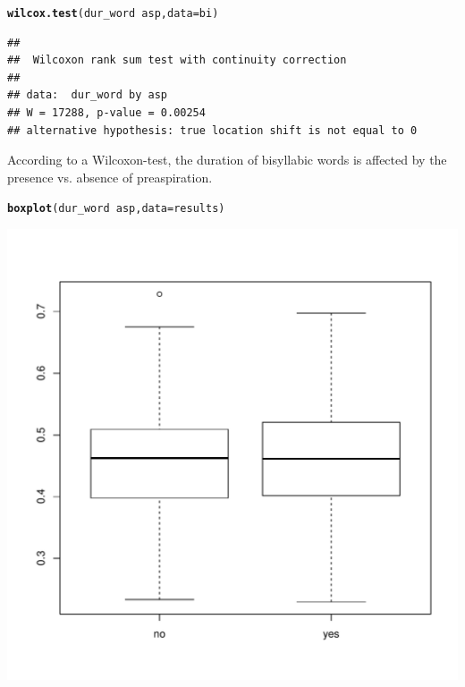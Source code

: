 \documentclass[a4paper,11pt]{article}\usepackage[]{graphicx}\usepackage[]{color}
\makeatletter
\def\maxwidth{ %
  \ifdim\Gin@nat@width>\linewidth
    \linewidth
  \else
    \Gin@nat@width
  \fi
}
\newcommand{\hlopt}[1]{\textcolor[rgb]{0,0,0}{#1}}%
\newcommand{\hlstd}[1]{\textcolor[rgb]{0.345,0.345,0.345}{#1}}%
\newcommand{\hlkwc}[1]{\textcolor[rgb]{0.333,0.667,0.333}{#1}}%
\newcommand{\hlkwd}[1]{\textcolor[rgb]{0.737,0.353,0.396}{\textbf{#1}}}%
\newenvironment{kframe}{%
 \def\at@end@of@kframe{}%
 \ifinner\ifhmode%
  \def\at@end@of@kframe{\end{minipage}}%
  \begin{minipage}{\columnwidth}%
 \fi\fi%
 \def\FrameCommand##1{\hskip\@totalleftmargin \hskip-\fboxsep
 \colorbox{shadecolor}{##1}\hskip-\fboxsep
     \hskip-\linewidth \hskip-\@totalleftmargin \hskip\columnwidth}%
 \MakeFramed {\advance\hsize-\width
   \@totalleftmargin\z@ \linewidth\hsize
   \@setminipage}}%
 {\par\unskip\endMakeFramed%
 \at@end@of@kframe}
\newenvironment{knitrout}{}{} %
\makeatother
\begin{document}
\begin{knitrout}
\color{fgcolor}\begin{kframe}
\begin{alltt}
\hlkwd{wilcox.test}\hlstd{(dur_word} \hlopt{~} \hlstd{asp,} \hlkwc{data} \hlstd{= bi)}
\end{alltt}
\begin{verbatim}
## 
## 	Wilcoxon rank sum test with continuity correction
## 
## data:  dur_word by asp
## W = 17288, p-value = 0.00254
## alternative hypothesis: true location shift is not equal to 0
\end{verbatim}
\end{kframe}
\end{knitrout}

According to a Wilcoxon-test, the duration of bisyllabic words is affected by the presence vs. absence of preaspiration.


\begin{knitrout}
\color{fgcolor}\begin{kframe}
\begin{alltt}
\hlkwd{boxplot}\hlstd{(dur_word} \hlopt{~} \hlstd{asp,} \hlkwc{data} \hlstd{= results)}
\end{alltt}
\end{kframe}

{\centering \includegraphics[width=\maxwidth]{img/results-box-1} 

}



\end{knitrout}
\end{document}
